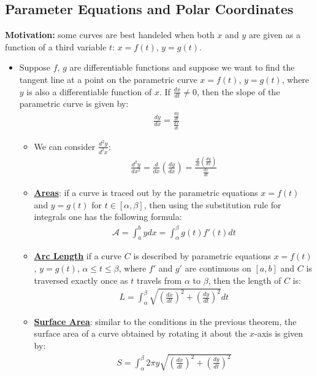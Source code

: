 \documentclass[reqno,11pt]{amsart}
\theoremstyle{definition}
\theoremstyle{remark}
\newcommand{\dfn}[1]{\underline{\textbf{#1}}}
\begin{document}
\subsection{Parameter Equations and Polar Coordinates}
\textbf{Motivation:} some curves are best handeled when both $x$ and $y$ are given as a function of a third variable $t$: $x=f(t)$, $y=g(t)$. 
\begin{itemize}
	\item Suppose $f$, $g$ are differentiable functions and suppose we want to find the tangent line at a point on the parametric curve $x=f(t)$, $y=g(t)$, where $y$ is also a differentiable function of $x$. If $\frac{dx}{dt} \neq 0$, then the slope of the parametric curve is given by: 
	\begin{align}
		\frac{dy}{dx} = \frac{\frac{dy}{dt}}{\frac{dx}{dt}}	
	\end{align}
	\begin{itemize}[noitemsep]
		\item We can consider $\frac{d^2 y}{d^2x}$: 
		\begin{align}
			\frac{d^2 y}{dx^2} = \frac{d}{dx} \left( \frac{dy}{dx} \right) = \frac{\frac{d}{dt} \left( \frac{dy}{dx} \right)}{\frac{dx}{dt}}	
		\end{align}
	\item \dfn{Areas}: if a curve is traced out by the parametric equations $x = f(t)$ and $y=g(t)$ for $t \in [\alpha, \beta]$, then using the substitution rule for integrals one has the following formula: 
	\begin{align}
		\mathcal{A} = \int_a^b y dx = \int_\alpha^\beta g(t) f'(t) dt	
	\end{align}
	\item \dfn{Arc Length} if a curve $C$ is described by parametric equations $x = f(t)$, $y= g(t)$, $\alpha \leq t \leq \beta$, where $f'$ and $g'$ are continuous on $[a,b]$ and $C$ is traversed exactly once as $t$ travels from $\alpha$ to $\beta$, then the length of $C$ is: 
	\begin{align}
		L = \int_\alpha^\beta \sqrt{ \left( \frac{dx}{dt} \right)^2 + \left( \frac{dy}{dt} \right)^2} dt 	
	\end{align}
	\item \dfn{Surface Area}: similar to the conditions in the previous theorem, the surface area of a curve obtained by rotating it about the $x$-axis is given by: 
	\begin{align}
		S = \int_\alpha^\beta 2 \pi y \sqrt{ \left( \frac{dx}{dt} \right)^2 + \left( \frac{dy}{dt} \right)^2}	
	\end{align}


\end{itemize}
\end{itemize}
\end{document}
